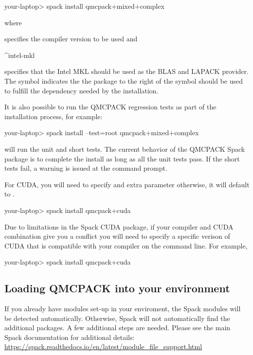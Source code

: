 \begin{shade}
your-laptop> spack install qmcpack+mixed+complex%
\end{shade}
where

\begin{shade}
\end{shade}
specifies the compiler version to be used and

\begin{shade}
^intel-mkl
\end{shade}
specifies that the Intel MKL should be used as the BLAS and LAPACK
provider. The \ishell{^} symbol indicates the the package to the right of the
symbol should be used to fulfill the dependency needed by the installation.

It is also possible to run the QMCPACK regression tests as part of the
installation process, for example:

\begin{shade}
your-laptop> spack install --test=root qmcpack+mixed+complex%
\end{shade}
will run the unit and short tests. The current behavior of the QMCPACK
Spack package is to complete the install as long as all the unit tests
pass. If the short tests fail, a warning is issued at the command prompt.

For CUDA, you will need to specify and extra 
parameter otherwise, it will default to .
\begin{shade}
your-laptop> spack install qmcpack+cuda%
\end{shade}

Due to limitations in the Spack CUDA package, if your compiler and
CUDA combination give you a conflict you will need to specify a
specific verison of CUDA that is compatible with your compiler on the
command line. For example,
\begin{shade}
your-laptop> spack install qmcpack+cuda%
\end{shade}

\subsection{Loading QMCPACK into your environment}
If you already have modules set-up in your enviroment, the Spack
modules will be detected automatically. Otherwise, Spack will not
automatically find the additional packages. A few additional steps are
needed.  Please see the main Spack documentation for additional details:
\url{https://spack.readthedocs.io/en/latest/module_file_support.html}

